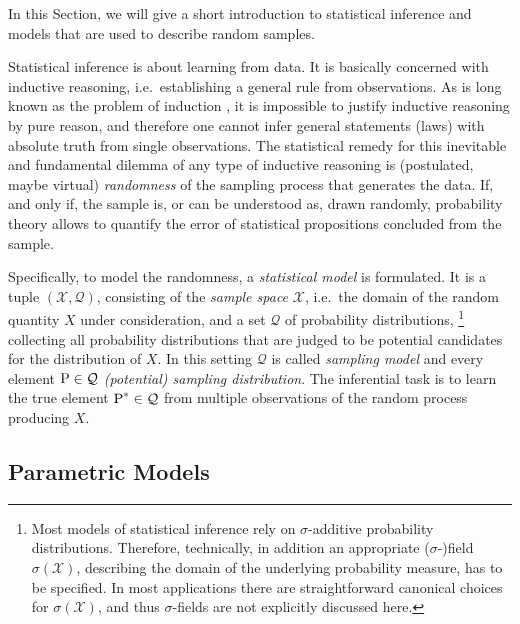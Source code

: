 
In this Section, we will give a short introduction to statistical inference
and models that are used to describe random samples.

Statistical inference is about learning from data.
It is basically concerned with inductive reasoning,
i.e.\ establishing a general rule from observations.
As is long known as the problem of induction \parencite{1739:hume},
it is impossible to justify inductive reasoning by pure reason,
and therefore one cannot infer general statements (laws) with absolute truth from single observations.
The statistical remedy for this inevitable and fundamental dilemma of any type of inductive reasoning is
(postulated, maybe virtual) \emph{randomness} of the sampling process that generates the data.
If, and only if, the sample is, or can be understood as, drawn randomly,
probability theory allows to quantify the error of statistical propositions concluded from the sample.

Specifically, to model the randomness, a \emph{statistical model} is formulated.
It is a tuple $(\mathcal{X}, \mathcal{Q})$, consisting of the \emph{sample space} $\mathcal{X}$,
i.e.\ the domain of the random quantity $X$ under consideration,
and a set $\mathcal{Q}$ of probability distributions,%
\footnote{Most models of statistical inference rely on $\sigma$-additive probability distributions.
Therefore, technically, in addition an appropriate ($\sigma$-)field $\sigma(\mathcal{X})$,
describing the domain of the underlying probability measure, has to be specified.
In most applications there are straightforward canonical choices for $\sigma(\mathcal{X})$,
and thus $\sigma$-fields are not explicitly discussed here.}
collecting all probability distributions that are judged to be potential candidates for the distribution of $X$.
In this setting $\mathcal{Q}$ is called \emph{sampling model} and every element $\operatorname{P}\in \mathcal{Q}$ \emph{(potential) sampling distribution}.
The inferential task is to learn the true element $\operatorname{P}^* \in \mathcal{Q}$ from multiple observations of the random process producing $X$.


\subsection{Parametric Models}
\label{sec:parametricmodels}

